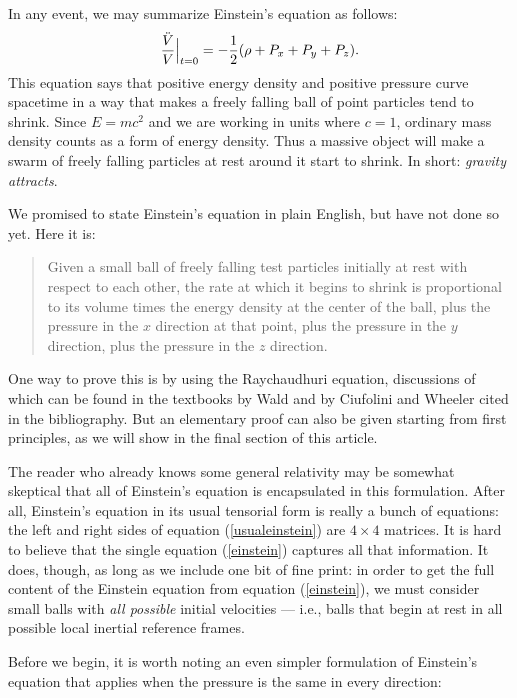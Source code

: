 In any event, we may summarize
Einstein's equation as follows:
\begin{equation}   {\ddot V\over V} \Bigr|_{t = 0} 
= -{1\over 2} (\rho + P_x + P_y + P_z). \label{einstein} \end{equation}
This equation says that positive energy density and positive pressure
curve spacetime in a way that makes a freely falling ball of point
particles tend to shrink.  Since $E = mc^2$ and we are working in units
where $c = 1$, ordinary mass density counts as a form of energy density.
Thus a massive object will make a swarm of freely falling particles at
rest around it start to shrink.  In short: {\it gravity attracts}.

We promised to state Einstein's equation in plain English, but have
not done so yet.  Here it is:

\begin{quote}
Given a small ball of freely falling test particles initially at rest
with respect to each other, the rate at which it begins to shrink is
proportional to its volume times the energy density at the center of
the ball, plus the pressure in the $x$ direction at that point, plus
the pressure in the $y$ direction, plus the pressure in the $z$
direction.
\end{quote}

One way to prove this is by using the Raychaudhuri equation, discussions
of which can be found in the textbooks by Wald and by Ciufolini
and Wheeler cited in the bibliography.  But an elementary
proof can also be given starting from first principles,
as we will show in the final section of this article.

The reader who already knows some
general relativity may be somewhat skeptical that all 
of Einstein's equation is encapsulated in this formulation.  After
all, Einstein's equation in its usual tensorial form is really
a bunch of equations: the left and right sides of equation
(\ref{usualeinstein}) are $4\times 4$ matrices.  It is hard to believe
that the single equation (\ref{einstein}) captures all that
information.  It does, though, as long as we include one bit of fine
print: in order to get the full content of the Einstein equation from
equation (\ref{einstein}), we must consider small balls with 
{\it all possible} initial velocities --- i.e., balls that begin
at rest in all possible local inertial reference frames.

Before we begin, it is worth noting an even simpler formulation
of Einstein's equation that applies when the pressure is the
same in every direction:

